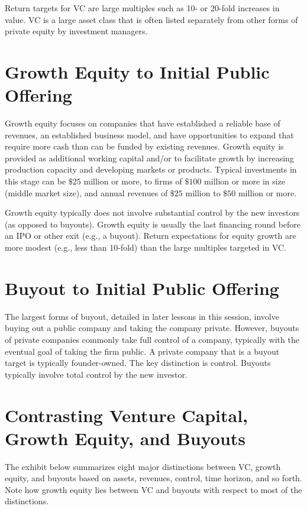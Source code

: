\documentclass[11pt]{article}
\begin{document}
Return targets for VC are large multiples such as 10- or 20-fold increases in value. VC is a large asset class that is often listed separately from other forms of private equity by investment managers.

\section*{Growth Equity to Initial Public Offering}
Growth equity focuses on companies that have established a reliable base of revenues, an established business model, and have opportunities to expand that require more cash than can be funded by existing revenues. Growth equity is provided as additional working capital and/or to facilitate growth by increasing production capacity and developing markets or products. Typical investments in this stage can be $\$ 25$ million or more, to firms of $\$ 100$ million or more in size (middle market size), and annual revenues of $\$ 25$ million to $\$ 50$ million or more.

Growth equity typically does not involve substantial control by the new investors (as opposed to buyouts). Growth equity is usually the last financing round before an IPO or other exit (e.g., a buyout). Return expectations for equity growth are more modest (e.g., less than 10-fold) than the large multiples targeted in VC.

\section*{Buyout to Initial Public Offering}
The largest forms of buyout, detailed in later lessons in this session, involve buying out a public company and taking the company private. However, buyouts of private companies commonly take full control of a company, typically with the eventual goal of taking the firm public. A private company that is a buyout target is typically founder-owned. The key distinction is control. Buyouts typically involve total control by the new investor.

\section*{Contrasting Venture Capital, Growth Equity, and Buyouts}
The exhibit below summarizes eight major distinctions between VC, growth equity, and buyouts based on assets, revenues, control, time horizon, and so forth. Note how growth equity lies between VC and buyouts with respect to most of the distinctions.
\end{document}
